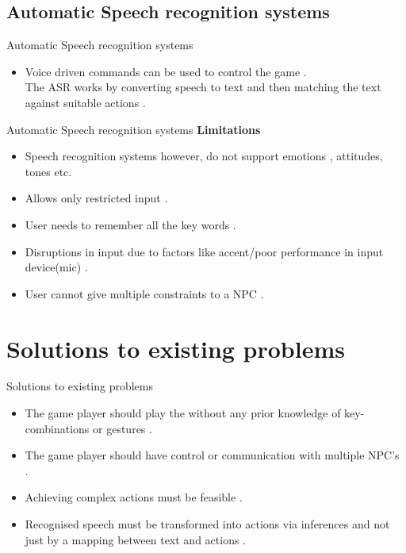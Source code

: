 \documentclass{beamer}
\begin{document}
\subsection{Automatic Speech recognition systems }
\begin{frame}{Automatic Speech recognition systems}
\begin{itemize}
\item
Voice driven commands can be used to control the game .\\ The ASR works by converting speech to text and then matching the text against suitable actions .
\end{itemize}
\end{frame}


 \begin{frame}{Automatic Speech recognition systems}
\textbf{Limitations}

\begin{itemize}
\item
Speech recognition systems however, do not support emotions , attitudes, tones etc. 
\end{itemize}

\begin{itemize}
\item			
			Allows only restricted input .
\end{itemize}

\begin{itemize}
\item
			User needs to remember all the key words .
\end{itemize}

\begin{itemize}
\item
			Disruptions in input due to factors like accent/poor performance in input device(mic) .
\end{itemize}

\begin{itemize}
\item
			User cannot give multiple constraints to a NPC .
\end{itemize}
\end{frame}

\section{Solutions to existing problems}
\begin{frame}{Solutions to existing problems}
\small
\begin{itemize}
\item
The game player should play the without any prior knowledge of key-combinations or gestures .
\item
The game player should have control or communication with multiple NPC's .
\item
Achieving complex actions must be feasible .	 
\item
Recognised speech must be transformed into actions via inferences and not just by a mapping between  text and actions .
\end{itemize}
\end{frame}
\end{document}
